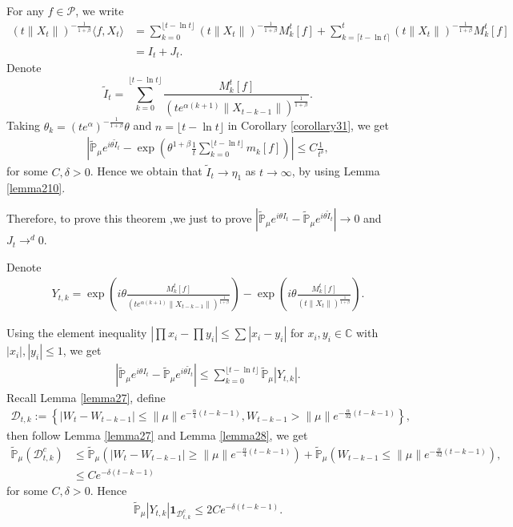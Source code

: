 \documentclass[12pt,oneside,english]{amsart}
\theoremstyle{plain}
\theoremstyle{definition}
\numberwithin{equation}{section}
\begin{document}
    For any $f\in\mathcal{P}$, we write
    \begin{align*}
        (t\|X_t\|)^{-\frac{1}{1+\beta}}\langle f,X_t\rangle&=\sum_{k=0}^{\lfloor t-\ln t \rfloor} (t\|X_t\|)^{-\frac{1}{1+\beta}}M_k^t[f]+\sum_{k=\lceil t-\ln t \rceil}^t (t\|X_t\|)^{-\frac{1}{1+\beta}}M_k^t[f]\\
        &=I_t+J_t.
    \end{align*}
    Denote
    $$\tilde{I}_t=\sum_{k=0}^{\lfloor t-\ln t \rfloor}\frac{M_k^t[f]}{(t e^{\alpha(k+1)}\|X_{t-k-1}\|)^{\frac{1}{1+\beta}}}.$$
    Taking $\theta_k=(t e^{\alpha})^{-\frac{1}{1+\beta}} \theta $ and $n={\lfloor t-\ln t \rfloor}$ in Corollary \ref{corollary31}, we get
    \begin{align*}
        \left|\mathbb{\tilde{P}}_{\mu}e^{i\theta\tilde{I}_t}-\exp\left(\theta^{1+\beta}\frac{1}{t}\sum_{k=0}^{\lfloor t-\ln t \rfloor}m_k[f]\right)\right|\leq C \frac{1}{t^{\delta}},
    \end{align*}
    for some $C,\delta>0$. Hence we obtain that $\tilde{I}_t\rightarrow\eta_1$ as $t\rightarrow \infty$, by using Lemma \ref{lemma210}.

    Therefore, to prove this theorem ,we just to prove $\left|\mathbb{\tilde{P}}_{\mu}e^{i\theta I_t}-\mathbb{\tilde{P}}_{\mu}e^{i\theta\tilde{I}_t}\right|\rightarrow 0$ and $J_t\rightarrow^d 0$.

    Denote
    \begin{align*}
        Y_{t,k}=\exp\left(i\theta\frac{M_k^t[f]}{(t e^{\alpha(k+1)}\|X_{t-k-1}\|)^{\frac{1}{1+\beta}}}\right)-\exp\left(i\theta\frac{M_k^t[f]}{\left(t\|X_t\|\right)^{\frac{1}{1+\beta}}}\right).
    \end{align*}

    Using the element inequality $|\prod x_i-\prod y_i|\leq\sum |x_i-y_i|$ for $x_i,y_i \in \mathbb{C}$ with $|x_i|,|y_i|\leq 1$, we get
    \begin{align*}
        \left|\mathbb{\tilde{P}}_{\mu}e^{i\theta I_t}-\mathbb{\tilde{P}}_{\mu}e^{i\theta\tilde{I}_t}\right|\leq \sum_{k=0}^{\lfloor t-\ln t \rfloor}\mathbb{\tilde{P}}_{\mu}|Y_{t,k}|.
    \end{align*}
    Recall Lemma \ref{lemma27}, define
    \begin{align*}
        \mathcal{D}_{t,k}:=\left\{|W_t-W_{t-k-1}|\leq \|\mu\| e^{-\frac{\alpha}{4}(t-k-1)}, W_{t-k-1}>\|\mu\|e^{-\frac{\alpha}{32}(t-k-1)}\right\},
    \end{align*}
    then follow Lemma \ref{lemma27} and Lemma \ref{lemma28}, we get
    \begin{align*}
        \mathbb{\tilde{P}}_{\mu}(\mathcal{D}_{t,k}^c)&\leq \mathbb{\tilde{P}}_{\mu}(|W_t-W_{t-k-1}|\geq \|\mu\| e^{-\frac{\alpha}{4}(t-k-1)})+\mathbb{\tilde{P}}_{\mu}(W_{t-k-1}\leq \|\mu\|e^{-\frac{\alpha}{32}(t-k-1)}),\\
        &\leq C e^{-\delta(t-k-1)}
    \end{align*}
    for some $C,\delta>0$. Hence
    \begin{align}
        \mathbb{\tilde{P}}_{\mu}|Y_{t,k}|\mathbf{1}_{\mathcal{D}^c_{t,k}}\leq 2 C e^{-\delta(t-k-1)}.\label{thm121}
    \end{align}
\end{document}
